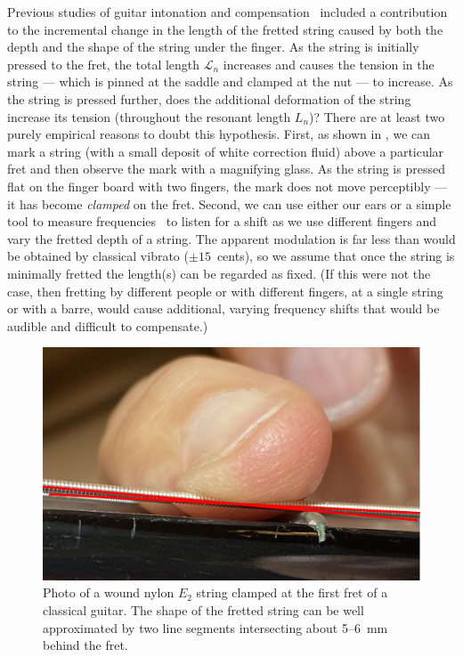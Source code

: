 Previous studies of guitar intonation and compensation~\cite{ref:byers1996cgi,ref:varieschi2010icf} included a contribution to the incremental change in the length of the fretted string caused by both the depth and the shape of the string under the finger. As the string is initially pressed to the fret, the total length $\mathcal{L}_n$ increases and causes the tension in the string --- which is pinned at the saddle and clamped at the nut --- to increase. As the string is pressed further, does the additional deformation of the string increase its tension (throughout the resonant length $L_n$)? There are at least two purely empirical reasons to doubt this hypothesis. First, as shown in , we can mark a string (with a small deposit of white correction fluid) above a particular fret and then observe the mark with a magnifying glass. As the string is pressed flat on the finger board with two fingers, the mark does not move perceptibly --- it has become \emph{clamped} on the fret. Second, we can use either our ears or a simple tool to measure frequencies~\cite{ref:pgtweb} to listen for a shift as we use different fingers and vary the fretted depth of a string. The apparent modulation is far less than would be obtained by classical vibrato ($\pm15$~cents), so we assume that once the string is minimally fretted the length(s) can be regarded as fixed. (If this were not the case, then fretting by different people or with different fingers, at a single string or with a barre, would cause additional, varying frequency shifts that would be audible and difficult to compensate.)


\begin{figure}
    \centering
    \includegraphics[width=6.0in]{../figures/fretting_photo}
    \caption{\label{fig:fretting_photo} Photo of a wound nylon $E_2$ string clamped at the first fret of a classical guitar. The shape of the fretted string can be well approximated by two line segments intersecting about 5--6~mm behind the fret.}
\end{figure}

